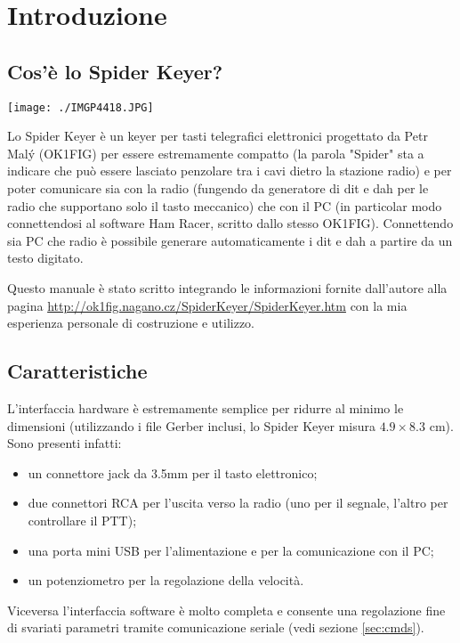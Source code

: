 \chapter{Introduzione}

\section{Cos'\`e lo Spider Keyer?}
\begin{center}
	\texttt{[image: ./IMGP4418.JPG]}
\end{center}
Lo Spider Keyer \`e un keyer per tasti telegrafici elettronici progettato da Petr Mal\'y (OK1FIG) per essere estremamente compatto (la parola "Spider" sta a indicare che pu\`o essere lasciato penzolare tra i cavi dietro la stazione radio) e per poter comunicare sia con la radio (fungendo da generatore di dit e dah per le radio che supportano solo il tasto meccanico) che con il PC (in particolar modo connettendosi al software Ham Racer, scritto dallo stesso OK1FIG).
Connettendo sia PC che radio \`e possibile generare automaticamente i dit e dah a partire da un testo digitato.

Questo manuale \`e stato scritto integrando le informazioni fornite dall'autore alla pagina \url{http://ok1fig.nagano.cz/SpiderKeyer/SpiderKeyer.htm} con la mia esperienza personale di costruzione e utilizzo.

\section{Caratteristiche}
L'interfaccia hardware \`e estremamente semplice per ridurre al minimo le dimensioni (utilizzando i file Gerber inclusi, lo Spider Keyer misura $4.9 \times 8.3$ cm). Sono presenti infatti:
\begin{itemize}
	\item un connettore jack da 3.5mm per il tasto elettronico;
	\item due connettori RCA per l'uscita verso la radio (uno per il segnale, l'altro per controllare il PTT);
	\item una porta mini USB per l'alimentazione e per la comunicazione con il PC;
	\item un potenziometro per la regolazione della velocit\`a.
\end{itemize}

Viceversa l'interfaccia software \`e molto completa e consente una regolazione fine di svariati parametri tramite comunicazione seriale (vedi sezione \ref{sec:cmds}).